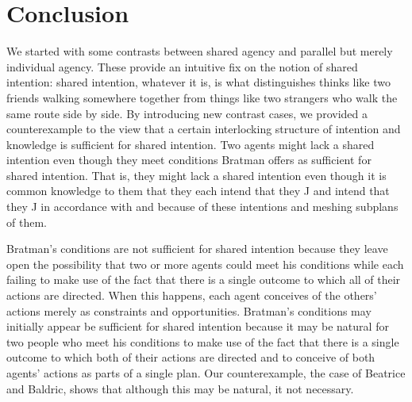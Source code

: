 \documentclass[12pt,\papersize]{extarticle}
\begin{document}
%
%
%


\section{Conclusion}
We started with some contrasts between shared agency and parallel but merely individual agency.
These provide an intuitive fix on the notion of shared intention: 
 shared intention, whatever it is, is what distinguishes thinks like two friends walking somewhere together from things like two strangers who walk the same route side by side.
By introducing new contrast cases,
we provided a counterexample to the view that a certain interlocking structure of intention and knowledge is sufficient for shared intention. 
Two agents might lack a shared intention even though they meet conditions Bratman offers as sufficient for shared intention. 
That is, they might lack a shared intention even though it is common knowledge to them that they  each intend that they J and intend that they J in accordance with and because of these intentions and meshing subplans of them.

Bratman's conditions are not sufficient for shared intention because they leave open the possibility that two or more agents could meet his conditions while each failing to make use of the fact that there is a single outcome to which all of their actions are directed.
When this happens, each agent conceives of the others' actions merely as constraints and opportunities.
Bratman's conditions may initially appear be sufficient for shared intention because it may be natural for two people who meet his conditions to make use of the fact that there is a single outcome to which both of their actions are directed and  to conceive of both agents' actions as parts of a single plan. 
Our counterexample, the case of Beatrice and Baldric, shows that although this may be natural, it not necessary.
\end{document}
